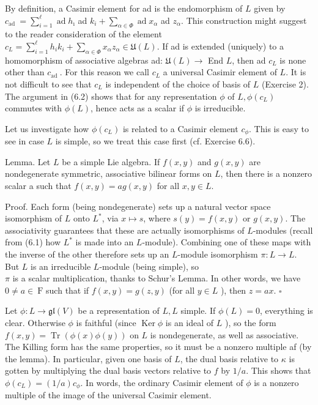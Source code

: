 \documentclass[10pt]{article}
\begin{document}
By definition, a Casimir element for ad is the endomorphism of $L$ given by $c_{\text {ad }}=\sum_{i=1}^{\ell} \operatorname{ad} h_{\imath}$ ad $k_{i}+\sum_{\alpha \in \Phi} \operatorname{ad} x_{\alpha}$ ad $z_{\alpha}$. This construction might suggest to the reader consideration of the element $c_{L}=\sum_{i=1}^{\ell} h_{i} k_{i}+\sum_{\alpha \in \Phi} x_{\alpha} z_{\alpha} \in \mathfrak{U}(L)$. If ad is extended (uniquely) to a homomorphism of associative algebras ad: $\mathfrak{U}(L) \rightarrow$ End $L$, then ad $c_{L}$ is none other than $c_{\text {ad }}$. For this reason we call $c_{L}$ a universal Casimir element of $L$. It is not difficult to see that $c_{L}$ is independent of the choice of basis of $L$ (Exercise 2). The argument in (6.2) shows that for any representation $\phi$ of $L, \phi\left(c_{L}\right)$ commutes with $\phi(L)$, hence acts as a scalar if $\phi$ is irreducible.

Let us investigate how $\phi\left(c_{L}\right)$ is related to a Casimir element $c_{\phi}$. This is easy to see in case $L$ is simple, so we treat this case first (cf. Exercise 6.6).

Lemma. Let $L$ be a simple Lie algebra. If $f(x, y)$ and $g(x, y)$ are nondegenerate symmetric, associative bilinear forms on $L$, then there is a nonzero scalar a such that $f(x, y)=a g(x, y)$ for all $x, y \in L$.

Proof. Each form (being nondegenerate) sets up a natural vector space isomorphism of $L$ onto $L^{*}$, via $x \mapsto s$, where $s(y)=f(x, y)$ or $g(x, y)$. The associativity guarantees that these are actually isomorphisms of $L$-modules (recall from (6.1) how $L^{*}$ is made into an $L$-module). Combining one of these maps with the inverse of the other therefore sets up an $L$-module isomorphism $\pi: L \rightarrow L$. But $L$ is an irreducible $L$-module (being simple), so\\
$\pi$ is a scalar multiplication, thanks to Schur's Lemma. In other words, we have $0 \neq a \in \mathrm{~F}$ such that if $f(x, y)=g(z, y)$ (for all $y \in L$ ), then $z=a x$. $\square$

Let $\phi: L \rightarrow \mathfrak{g l}(V)$ be a representation of $L, L$ simple. If $\phi(L)=0$, everything is clear. Otherwise $\phi$ is faithful (since $\operatorname{Ker} \phi$ is an ideal of $L$ ), so the form $f(x, y)=\operatorname{Tr}(\phi(x) \phi(y))$ on $L$ is nondegenerate, as well as associative. The Killing form has the same properties, so it must be a nonzero multiple af (by the lemma). In particular, given one basis of $L$, the dual basis relative to $\kappa$ is gotten by multiplying the dual basis vectors relative to $f$ by $1 / a$. This shows that $\phi\left(c_{L}\right)=(1 / a) c_{\phi}$. In words, the ordinary Casimir element of $\phi$ is a nonzero multiple of the image of the universal Casimir element.
\end{document}
